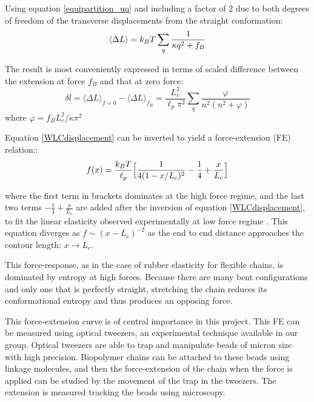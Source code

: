 Using equation \ref{equipartition_uq} and including a factor of $2$ due to both
degrees of freedom of the transverse displacements from the straight
conformation:
\begin{equation}\label{deltaLmean}
\langle\Delta L\rangle = k_B{}T\sum_q \frac{1}{\kappa{}q^2+f_B}
\end{equation}

The result is most conveniently expressed in terms of scaled difference between
the extension at force $f_B$ and that at zero force\citep{storm_nonlinear_2005}:
\begin{equation}\label{WLCdisplacement}
\delta l=\langle\Delta L\rangle_{f=0} - \langle\Delta L\rangle_{f_B} =
\frac{L_c^2}{\ell_p\pi^2} \sum_q \frac{\varphi}{n^2(n^2 + \varphi)}
\end{equation} 
where $\varphi = f_BL_c^2/\kappa{}\pi^2$

Equation \ref{WLCdisplacement} can be inverted to yield a force-extension (FE)
relation:\citep{marko_stretching_1995}:
\begin{equation}\label{FEMarko}
f(x)=\frac{k_B{}T}{\ell_p} \Big[ \frac{1}{4(1 - x/L_c)^2} 
-\frac{1}{4}+\frac{x}{L_c} \Big]
\end{equation}

where the first term in brackets dominates at the
high force regime, and the last two terms $-\frac{1}{4}+\frac{x}{L_c}$ are added
after the inversion of equation \ref{WLCdisplacement}, to fit the linear
elasticity observed experimentally at low force regime
\citep{marko_stretching_1995}.
This equation diverges as $f \sim (x - L_c)^{-2}$ as the end to end
distance approaches the contour length: $x\rightarrow L_c$.

This force-response, as in the case of rubber elasticity  for flexible
chains, is dominated by entropy at high forces. Because there are many
bent configurations and only one that is perfectly straight, stretching the
chain reduces its conformational entropy and thus produces an opposing
force.

This force-extension curve is of central importance in this project. This FE can
be measured using optical tweezers, an experimental technique available in our
group. Optical tweezers are able to trap and manipulate beads of
micron size with high
precision\citep{svoboda_direct_1993,svoboda_biological_1994}.
Biopolymer chains can be attached to these beads using linkage molecules, and then the force-extension of the
chain when the force is applied can be studied by the movement of the trap in
the tweezers.
The extension is measured tracking the beads using microscopy.

